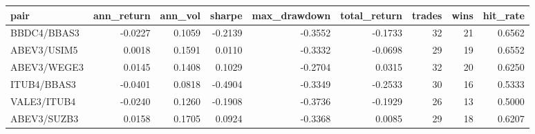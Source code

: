 
\begin{tabular}{lrrrrrrrr}
\toprule
pair & ann\_return & ann\_vol & sharpe & max\_drawdown & total\_return & trades & wins & hit\_rate\\
\midrule
BBDC4/BBAS3 & -0.0227 & 0.1059 & -0.2139 & -0.3552 & -0.1733 & 32 & 21 & 0.6562\\
ABEV3/USIM5 & 0.0018 & 0.1591 & 0.0110 & -0.3332 & -0.0698 & 29 & 19 & 0.6552\\
ABEV3/WEGE3 & 0.0145 & 0.1408 & 0.1029 & -0.2704 & 0.0315 & 32 & 20 & 0.6250\\
ITUB4/BBAS3 & -0.0401 & 0.0818 & -0.4904 & -0.3349 & -0.2533 & 30 & 16 & 0.5333\\
VALE3/ITUB4 & -0.0240 & 0.1260 & -0.1908 & -0.3736 & -0.1929 & 26 & 13 & 0.5000\\
\addlinespace
ABEV3/SUZB3 & 0.0158 & 0.1705 & 0.0924 & -0.3368 & 0.0085 & 29 & 18 & 0.6207\\
\bottomrule
\end{tabular}
